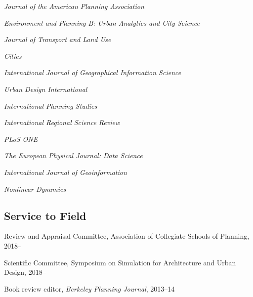 \documentclass[12pt,letterpaper]{report}
\newcommand{\listitemspace}{0.15em}
\renewenvironment{itemize}
{\begin{list}{}{\setlength{\leftmargin}{0em}
				\setlength{\parskip}{0em}
				\setlength{\itemsep}{\listitemspace}
				\setlength{\parsep}{\listitemspace}}}
{\end{list}}
\begin{document}
\begin{itemize}

\item \textit{Journal of the American Planning Association}

\item \textit{Environment and Planning B: Urban Analytics and City Science}

\item \textit{Journal of Transport and Land Use}

\item \textit{Cities}

\item \textit{International Journal of Geographical Information Science}

\item \textit{Urban Design International}

\item \textit{International Planning Studies}

\item \textit{International Regional Science Review}

\item \textit{PLoS ONE}

\item \textit{The European Physical Journal: Data Science}

\item \textit{International Journal of Geoinformation}

\item \textit{Nonlinear Dynamics}

\end{itemize}

\subsection*{Service to Field}

\begin{itemize}
	
\item Review and Appraisal Committee, Association of Collegiate Schools of Planning, 2018--

\item Scientific Committee, Symposium on Simulation for Architecture and Urban Design, 2018--

\item Book review editor, \textit{Berkeley Planning Journal}, 2013--14
	
\end{itemize}
\end{document}
